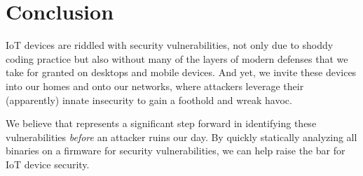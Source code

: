 \section{Conclusion}
\label{sec:conclusion}

IoT devices are riddled with security vulnerabilities, not only due to shoddy coding practice but also without many of the layers of modern defenses that we take for granted on desktops and mobile devices.
And yet, we invite these devices into our homes and onto our networks, where attackers leverage their (apparently) innate insecurity to gain a foothold and wreak havoc.

We believe that \mango represents a significant step forward in identifying these vulnerabilities \emph{before} an attacker ruins our day.
By quickly statically analyzing all binaries on a firmware for security vulnerabilities, we can help raise the bar for IoT device security.


